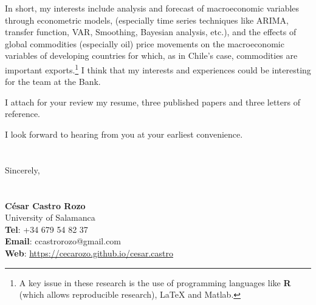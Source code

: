 \documentclass{letter}\usepackage[]{graphicx}\usepackage[]{color}
\begin{document}
In short, my interests include analysis and forecast of macroeconomic variables through econometric models, (especially time series techniques like ARIMA, transfer function, VAR, Smoothing, Bayesian analysis, etc.), and the effects of global commodities (especially oil) price movements on the macroeconomic variables of developing countries for which, as in Chile's case, commodities are important exports.\footnote{A key issue in these research is the use of programming languages like \textbf{\textsf{R}} (which allows reproducible research), {\LaTeX} and Matlab.} I think that my interests and experiences could be interesting for the team at the Bank. 

I attach for your review my resume, three published papers and three letters of reference. 


I look forward to hearing from you at your earliest convenience.\\
\\
\\
Sincerely,\\
\\
\\
\textbf{César Castro Rozo}\\
University of Salamanca\\
\textbf{Tel}: +34 679 54 82 37\\
\textbf{Email}: ccastrorozo@gmail.com\\
\textbf{Web}: \href{https://cecarozo.github.io/cesar.castro}{https://cecarozo.github.io/cesar.castro}



\end{document}
